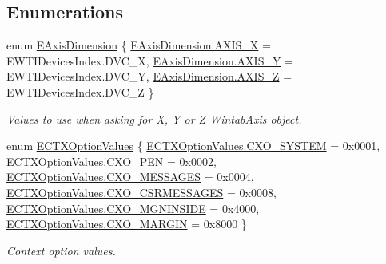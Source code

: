 \subsection*{Enumerations}
\begin{DoxyCompactItemize}
\item 
enum \mbox{\hyperlink{namespace_wintab_d_n_a38705aa38c49c04846399172fa9fd1cd}{E\+Axis\+Dimension}} \{ \mbox{\hyperlink{namespace_wintab_d_n_a38705aa38c49c04846399172fa9fd1cdafb7ec808a21c7770ccd7060e715983ba}{E\+Axis\+Dimension.\+A\+X\+I\+S\+\_\+X}} = E\+W\+T\+I\+Devices\+Index.\+D\+V\+C\+\_\+X, 
\mbox{\hyperlink{namespace_wintab_d_n_a38705aa38c49c04846399172fa9fd1cda3e69e41ce011d74658d6ccce110e5f1a}{E\+Axis\+Dimension.\+A\+X\+I\+S\+\_\+Y}} = E\+W\+T\+I\+Devices\+Index.\+D\+V\+C\+\_\+Y, 
\mbox{\hyperlink{namespace_wintab_d_n_a38705aa38c49c04846399172fa9fd1cda19aa520601d5d2f29571f14a3278216f}{E\+Axis\+Dimension.\+A\+X\+I\+S\+\_\+Z}} = E\+W\+T\+I\+Devices\+Index.\+D\+V\+C\+\_\+Z
 \}
\begin{DoxyCompactList}\small\item\em Values to use when asking for X, Y or Z Wintab\+Axis object. \end{DoxyCompactList}\item 
enum \mbox{\hyperlink{namespace_wintab_d_n_a701e8021b6889039ed562596a2d1bdd2}{E\+C\+T\+X\+Option\+Values}} \{ \newline
\mbox{\hyperlink{namespace_wintab_d_n_a701e8021b6889039ed562596a2d1bdd2a6a2dbfc83a1b63b06d00fa7fbdf841e6}{E\+C\+T\+X\+Option\+Values.\+C\+X\+O\+\_\+\+S\+Y\+S\+T\+EM}} = 0x0001, 
\mbox{\hyperlink{namespace_wintab_d_n_a701e8021b6889039ed562596a2d1bdd2a1188b3bdf64b7ce3ac8b0dfbbbcd79ab}{E\+C\+T\+X\+Option\+Values.\+C\+X\+O\+\_\+\+P\+EN}} = 0x0002, 
\mbox{\hyperlink{namespace_wintab_d_n_a701e8021b6889039ed562596a2d1bdd2a27fdcdd9ab4b471db2109a328c40cc8d}{E\+C\+T\+X\+Option\+Values.\+C\+X\+O\+\_\+\+M\+E\+S\+S\+A\+G\+ES}} = 0x0004, 
\mbox{\hyperlink{namespace_wintab_d_n_a701e8021b6889039ed562596a2d1bdd2a2bbf4dbbadddd85531bf5c0224cdfa8c}{E\+C\+T\+X\+Option\+Values.\+C\+X\+O\+\_\+\+C\+S\+R\+M\+E\+S\+S\+A\+G\+ES}} = 0x0008, 
\newline
\mbox{\hyperlink{namespace_wintab_d_n_a701e8021b6889039ed562596a2d1bdd2a70d0e87bbdf4cb7110640ac0f47747f0}{E\+C\+T\+X\+Option\+Values.\+C\+X\+O\+\_\+\+M\+G\+N\+I\+N\+S\+I\+DE}} = 0x4000, 
\mbox{\hyperlink{namespace_wintab_d_n_a701e8021b6889039ed562596a2d1bdd2a3c2c4234d4c16baa098b7c979a231f1b}{E\+C\+T\+X\+Option\+Values.\+C\+X\+O\+\_\+\+M\+A\+R\+G\+IN}} = 0x8000
 \}
\begin{DoxyCompactList}\small\item\em Context option values. \end{DoxyCompactList}\item 

\end{DoxyCompactItemize}
